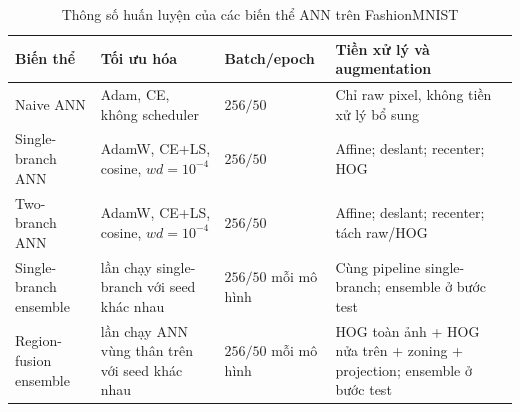 \begin{table}[H]
\centering
\caption{Thông số huấn luyện của các biến thể ANN trên FashionMNIST}
\label{tab:fashion-ann-hyperparameters}
\small
\begin{tabularx}{\textwidth}{>{\raggedright\arraybackslash}p{3cm} >{\raggedright\arraybackslash}p{3.2cm} >{\raggedright\arraybackslash}p{2.2cm} >{\raggedright\arraybackslash}X}
\toprule
Biến thể & Tối ưu hóa & Batch/epoch & Tiền xử lý và augmentation \\
\midrule
Naive ANN & Adam, CE, không scheduler & $256 / 50$ & Chỉ raw pixel, không tiền xử lý bổ sung \\
Single-branch ANN & AdamW, CE+LS, cosine, $wd=10^{-4}$ & $256 / 50$ & Affine; deslant; recenter; HOG \\
Two-branch ANN & AdamW, CE+LS, cosine, $wd=10^{-4}$ & $256 / 50$ & Affine; deslant; recenter; tách raw/HOG \\
Single-branch ensemble & 3 lần chạy single-branch với seed khác nhau & $256 / 50$ mỗi mô hình & Cùng pipeline single-branch; ensemble ở bước test \\
Region-fusion ensemble & 3 lần chạy ANN vùng thân trên với seed khác nhau & $256 / 50$ mỗi mô hình & HOG toàn ảnh + HOG nửa trên + zoning + projection; ensemble ở bước test \\
\bottomrule
\end{tabularx}
\end{table}
